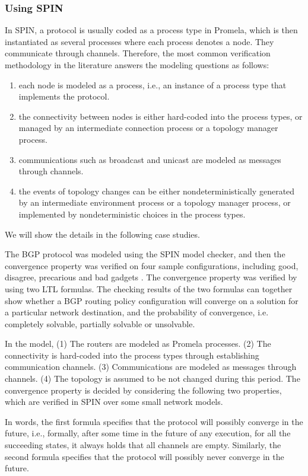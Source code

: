 \documentclass[a4paper,10pt,twocolumn]{article}
\begin{document}
\subsubsection{Using SPIN}
In SPIN, a protocol is usually coded as a process type  in Promela, which is then instantiated as several processes where each process denotes a node. They communicate through channels. Therefore, the most common verification methodology in the literature answers the modeling questions as follows:
\begin{enumerate}
  \item each node is modeled as a process, i.e., an instance of a process type that implements the protocol.
  \item the connectivity between nodes is either hard-coded into the process types, or managed by an intermediate connection process or a topology manager process.
  \item communications such as broadcast and unicast are modeled as messages through channels.
  \item the events of topology changes can be either nondeterministically generated by an intermediate environment process or a topology manager process, or implemented by nondeterministic choices in the process types.
\end{enumerate}
We will show the details in the following case studies.

The BGP protocol was modeled using the SPIN model checker, and then the convergence property was verified on four sample configurations, including good, disagree, precarious and bad gadgets \cite{Huadmai11}. The convergence property was verified by using two LTL formulas. The checking results of the two formulas can together show whether a BGP routing policy configuration will converge on a solution for a particular network destination, and the probability of convergence, i.e. completely solvable, partially solvable or unsolvable.

In the model, (1) The routers are modeled as Promela processes. (2) The connectivity is hard-coded into the process types through establishing communication channels. (3) Communications are modeled as messages through channels. (4) The topology is assumed to be not changed during this period. The convergence property is decided by considering the following two properties, which are verified in SPIN over some small network models.

In words, the first formula specifies that the protocol will possibly converge in the future, i.e., formally, after some time in the future of any execution, for all the succeeding states, it always holds that all channels are empty. Similarly, the second formula specifies that the protocol will possibly never converge in the future.
\end{document}
